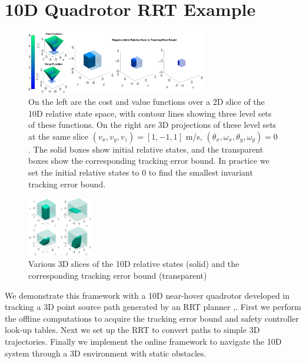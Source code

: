 \section{10D Quadrotor RRT Example \label{sec:results}}


\begin{figure}
	\centering
	\includegraphics[width=0.7\textwidth]{fig/quad10D_example_cost}
	\caption{On the left are the cost and value functions over a 2D slice of the 10D relative state space, with contour lines showing three level sets of these functions. On the right are 3D projections of these level sets at the same slice $(v_{x},v_{y},v_{z})=[1, -1, 1]$ m/s, $(\theta_{x},\omega_{x},\theta_{y},\omega_{y})=0$. The solid boxes show initial relative states, and the transparent boxes show the corresponding tracking error bound. In practice we set the initial relative states to 0 to find the smallest invariant tracking error bound.}
	\label{fig:quad10D_example}
	\end{figure} 
\begin{figure}
	\centering
	\includegraphics[width=0.25\textwidth]{fig/quad10D_slices}
	\caption{Various 3D slices of the 10D relative states (solid) and the corresponding tracking error bound (transparent)}
	\label{fig:quad10D_example_slices}
\end{figure} 
We demonstrate this framework with a 10D near-hover quadrotor developed in \cite{Bouffard12} tracking a 3D point source path generated by an RRT planner \cite{Kuffner2000},\cite{Kavraki1996}. First we perform the offline computations to acquire the tracking error bound and safety controller look-up tables. Next we set up the RRT to convert paths to simple 3D trajectories. Finally we implement the online framework to navigate the 10D system through a 3D environment with static obstacles.

